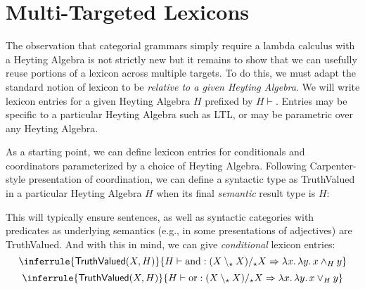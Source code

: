 \documentclass[11pt,a4paper,acceptedWithA]{article}
\begin{document}
\section{Multi-Targeted Lexicons}
The observation that categorial grammars simply require a lambda calculus with a Heyting Algebra is not strictly new but it remains to show that we can usefully reuse portions of a lexicon across multiple targets.
To do this, we must adapt the standard notion of lexicon to be \emph{relative to a given Heyting Algebra}. We will write lexicon entries for a given Heyting Algebra $H$ prefixed by $H\vdash$.  Entries may be specific to a particular Heyting Algebra such as \textsc{LTL}, or may be parametric over any Heyting Algebra.

As a starting point, we can define lexicon entries for conditionals and coordinators parameterized by a choice of Heyting Algebra.
Following Carpenter-style presentation of coordination, we can define a syntactic type as \textsf{TruthValued} in a particular Heyting Algebra $H$ when its final \emph{semantic} result type is $H$:
This will typically ensure sentences, as well as syntactic categories with predicates as underlying semantics (e.g., in some presentations of adjectives) are \textsf{TruthValued}.
And with this in mind, we can give \emph{conditional} lexicon entries:
\[\inferrule{\mathsf{TruthValued}(X,H)}{H\vdash\textrm{and} : (X\setminus_\star X)/_\star X \Rightarrow \lambda x\ldotp\lambda y\ldotp x\wedge_H y}\]
\[\inferrule{\mathsf{TruthValued}(X,H)}{H\vdash\textrm{or} : (X\setminus_\star X)/_\star X \Rightarrow \lambda x\ldotp\lambda y\ldotp x\vee_H y}\]
\end{document}
